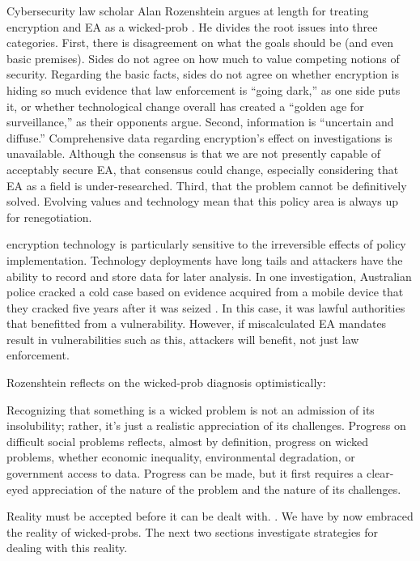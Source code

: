 Cybersecurity law scholar Alan Rozenshtein argues at length for treating \ac{encryption} and \ac{EA} as a
\ac{wicked-prob} \cite{rozenshtein_wicked_2018}. He divides the root issues into three categories. First, there is
disagreement on what the goals should be (and even basic premises). Sides do not agree on how much to value competing
notions of security. Regarding the basic facts, sides do not agree on whether encryption is hiding so much evidence that
law enforcement is ``going dark,'' as one side puts it, or whether technological change overall has created a ``golden
age for surveillance,'' as their opponents argue. Second, information is ``uncertain and diffuse.'' Comprehensive data
regarding encryption's effect on investigations is unavailable. Although the consensus is that we are not presently
capable of acceptably secure \ac{EA}, that consensus could change, especially considering that \ac{EA} as a field is
under-researched. Third, that the problem cannot be definitively solved. Evolving values and technology mean that this
policy area is always up for renegotiation.

\Ac{encryption} technology is particularly sensitive to the irreversible effects of policy implementation. Technology
deployments have long tails and attackers have the ability to record and store data for later analysis. In one
investigation, Australian police cracked a cold case based on evidence acquired from a mobile device that they cracked
five years after it was seized \cite{evans_arrests_2020}. In this case, it was lawful authorities that benefitted from a
vulnerability. However, if miscalculated \ac{EA} mandates result in vulnerabilities such as this, attackers will
benefit, not just law enforcement.

Rozenshtein reflects on the \ac{wicked-prob} diagnosis optimistically:

\begin{displayquote}
Recognizing that something is a wicked problem is not an admission of its insolubility; rather, it’s just a realistic
appreciation of its challenges. Progress on difficult social problems reflects, almost by definition, progress on wicked
problems, whether economic inequality, environmental degradation, or government access to data. Progress can be made,
but it first requires a clear-eyed appreciation of the nature of the problem and the nature of its challenges.
\cite{rozenshtein_wicked_2018}
\end{displayquote}

Reality must be accepted before it can be dealt with. \cite{baker_2019}. We have by now embraced the reality of
\acp{wicked-prob}. The next two sections investigate strategies for dealing with this reality.


